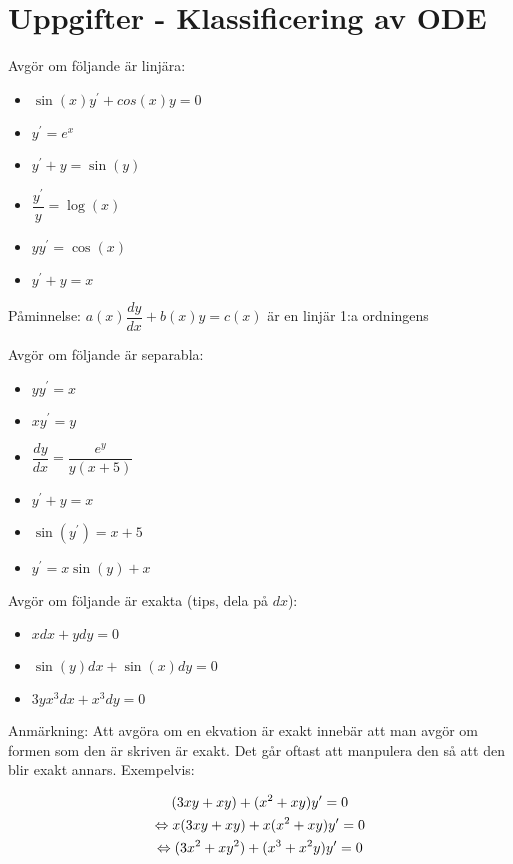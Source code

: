 \section{Uppgifter - Klassificering av ODE}

\noindent Avgör om följande är linjära:

\begin{itemize}
  \item $\sin(x)y^{\prime}+cos(x)y=0$
  \item $y^{\prime}=e^x$
  \item $y^{\prime}+y=\sin(y)$
  \item $\dfrac{y^{\prime}}{y}=\log(x)$
  \item $yy^{\prime}=\cos(x)$
  \item $y^{\prime}+y=x$
\end{itemize}

\noindent Påminnelse: $a(x)\dfrac{dy}{dx}+b(x)y=c(x)$ är en linjär 1:a ordningens
\par\bigskip

\noindent Avgör om följande är separabla:

\begin{itemize}
  \item $yy^{\prime}=x$
  \item $xy^{\prime}=y$
  \item $\dfrac{dy}{dx}=\dfrac{e^y}{y(x+5)}$
  \item $y^{\prime}+y=x$
  \item $\sin(y^{\prime})=x+5$
  \item $y^{\prime}=x\sin(y)+x$
\end{itemize}
\par\bigskip

\noindent Avgör om följande är exakta (tips, dela på $dx$):

\begin{itemize}
  \item $xdx+ydy=0$
  \item $\sin(y)dx+\sin(x)dy=0$
  \item $3yx^3dx+x^3dy=0$
\end{itemize}
\par\bigskip

\noindent Anmärkning: Att avgöra om en ekvation är exakt innebär att man avgör om formen som den är skriven är exakt. Det går oftast att manpulera den så att den blir exakt annars. Exempelvis:


\begin{equation*}
  \begin{gathered}
    (3xy+xy)+(x^2+xy)y^{\prime}=0\\
    \Leftrightarrow x(3xy+xy)+x(x^2+xy)y^{\prime}=0\\
    \Leftrightarrow (3x^2+xy^2)+(x^3+x^2y)y^{\prime}=0
  \end{gathered}
\end{equation*}
